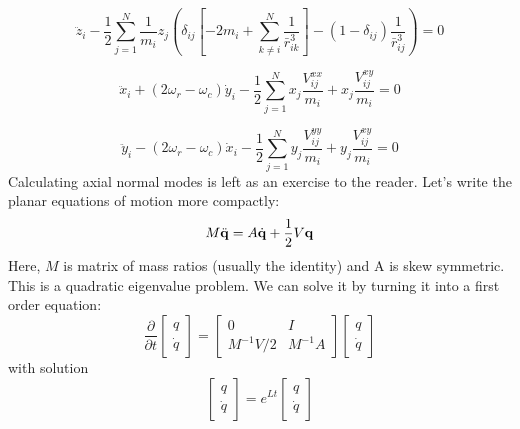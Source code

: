 \documentclass[12pt]{article}
\begin{document}
\begin{equation}
\ddot{z}_i - \frac{1}{2} \sum^N_{j=1}  \frac{1}{m_i} z_j \left( \delta_{i j} \left[ -2 m_{i}+\sum^N_{k \neq i}\frac{1}{\bar{r}^3_{i k}}\right]
-  \left(1- \delta_{i j} \right) \frac{1}{\bar{r}^3_{i j}} \right) = 0
\end{equation}

\begin{equation}
\ddot{x}_i +\left(2\omega_r - \omega_c \right) \dot{y}_i - \frac{1}{2} \sum^N_{j=1} x_j \frac{V^{xx}_{ij}}{m_i} + x_j \frac{V^{xy}_{ij}}{m_i} = 0
\end{equation}

\begin{equation}
\ddot{y}_i -\left(2\omega_r - \omega_c \right) \dot{x}_i - \frac{1}{2} \sum^N_{j=1} y_j \frac{V^{yy}_{ij}}{m_i} + y_j \frac{V^{xy}_{ij}}{m_i} = 0
\end{equation}
Calculating axial normal modes is left as an exercise to the reader. Let's write the planar equations of motion more compactly:
\begin{equation}
M\ddot{\bf{q}} = A\dot{\bf{q}} + \frac{1}{2}V\bf{q}
\end{equation}
Here, $M$ is matrix of mass ratios (usually the identity) and A is skew symmetric. This is a quadratic eigenvalue problem. We can solve it by turning it into a first order equation:
\begin{equation}
\frac{\partial}{\partial t} \begin{bmatrix} q \\ \dot{q} \end{bmatrix} = 
\begin{bmatrix} 0 & I \\ M^{-1} V/2 & M^{-1} A \end{bmatrix}  \begin{bmatrix} q \\ \dot{q} \end{bmatrix} 
\end{equation}
with solution 
\begin{equation}
 \begin{bmatrix} q \\ \dot{q} \end{bmatrix} = e^{Lt} \begin{bmatrix} q \\ \dot{q} \end{bmatrix} 
\end{equation}
\end{document}
